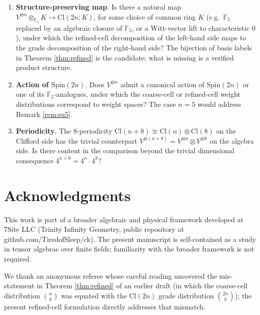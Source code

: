 \documentclass[11pt,reqno]{amsart}
\theoremstyle{plain}
\theoremstyle{definition}
\theoremstyle{remark}
\newcommand{\F}{\mathbb{F}}
\newcommand{\Cl}{\mathrm{Cl}}
\begin{document}
\begin{enumerate}
\item[(O1)]
\textbf{Structure-preserving map}.
Is there a natural map $V^{\otimes n} \otimes_{\F_5} K \to \Cl(2n; K)$,
for some choice of common ring $K$ (e.g.\ $\F_5$ replaced by an
algebraic closure of $\F_5$, or a Witt-vector lift to characteristic
$0$), under which the refined-cell decomposition of the left-hand side
maps to the grade decomposition of the right-hand side?
The bijection of basis labels in Theorem \ref{thm:refined} is the
candidate; what is missing is a verified product structure.

\item[(O2)]
\textbf{Action of $\mathrm{Spin}(2n)$}.
Does $V^{\otimes n}$ admit a canonical action of $\mathrm{Spin}(2n)$
or one of its $\F_5$-analogues, under which the coarse-cell or
refined-cell weight distributions correspond to weight spaces?
The case $n = 5$ would address Remark \ref{rem:su5}.

\item[(O3)]
\textbf{Periodicity}.
The 8-periodicity $\Cl(n+8) \cong \Cl(n) \otimes \Cl(8)$ on the
Clifford side has the trivial counterpart $V^{\otimes (n+8)} =
V^{\otimes n} \otimes V^{\otimes 8}$ on the algebra side.  Is there
content in the comparison beyond the trivial dimensional consequence
$4^{n+8} = 4^n \cdot 4^8$?
\end{enumerate}

\section*{Acknowledgments}

This work is part of a broader algebraic and physical framework
developed at 7Site LLC (Trinity Infinity Geometry, public repository
at github.com/TiredofSleep/ck). The present manuscript is
self-contained as a study in tensor algebras over finite fields;
familiarity with the broader framework is not required.

We thank an anonymous referee whose careful reading uncovered the
mis-statement in Theorem \ref{thm:refined} of an earlier draft (in
which the coarse-cell distribution $\binom{n}{k}$ was equated with the
$\Cl(2n)$ grade distribution $\binom{2n}{k}$); the present
refined-cell formulation directly addresses that mismatch.
\end{document}
